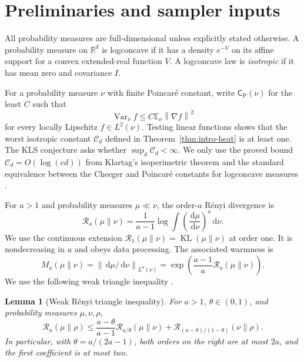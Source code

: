 \documentclass[11pt]{article}
\newtheorem{lemma}[theorem]{Lemma}
\theoremstyle{remark}
\newcommand{\R}{\mathbb R}
\newcommand{\E}{\mathbb E}
\newcommand{\1}{\bm 1}
\newcommand{\cP}{\mathsf C_{\mathrm P}}
\newcommand{\Var}{\operatorname{Var}}
\newcommand{\dd}{\,\mathrm d}
\newcommand{\norm}[1]{\left\lVert #1\right\rVert}
\begin{document}
\section{Preliminaries and sampler inputs}
\label{sec:preliminaries}

All probability measures are full-dimensional unless explicitly
stated otherwise.  A probability measure on $\R^d$ is logconcave if it
has a density $e^{-V}$ on its affine support for a convex extended-real
function $V$.  A logconcave law is \emph{isotropic} if it has mean zero
and covariance $I$.

For a probability measure $\nu$ with finite Poincar\'e constant, write
$\cP(\nu)$ for the least $C$ such that
\begin{equation}\label{eq:poincare}
  \Var_\nu f\leq C\E_\nu\norm{\nabla f}^2
\end{equation}
for every locally Lipschitz $f\in L^2(\nu)$.  Testing linear functions
shows that the worst isotropic constant $\mathcal C_d$ defined in
Theorem~\ref{thm:intro-heat} is at least one.  The KLS conjecture asks
whether $\sup_d\mathcal C_d<\infty$.  We only use the proved bound
$\mathcal C_d=O(\log(ed))$ from Klartag's isoperimetric theorem and the
standard equivalence between the Cheeger and Poincar\'e constants for
logconcave measures \citep{Chee70lower,Buser82iso,Led04spectral,Klartag23log}.

For $a>1$ and probability measures $\mu\ll\nu$, the order-$a$ R\'enyi
divergence is
\begin{equation}\label{eq:renyi}
  \mathcal R_a(\mu\|\nu)
  =\frac{1}{a-1}\log\int
    \left(\frac{\dd\mu}{\dd\nu}\right)^a\dd\nu.
\end{equation}
We use the continuous extension $\mathcal R_1(\mu\|\nu)
=\operatorname{KL}(\mu\|\nu)$ at order one.
It is nondecreasing in $a$ and obeys data processing.  The associated
warmness is
\[
  M_a(\mu\|\nu)
  =\norm{\dd\mu/\dd\nu}_{L^a(\nu)}
  =\exp\!\left(\frac{a-1}{a}\mathcal R_a(\mu\|\nu)\right).
\]
We use the following weak triangle inequality
\citep{vH14renyi,KV26zeroth}.

\begin{lemma}[Weak R\'enyi triangle inequality]
\label{lem:weak-triangle}
For $a>1$, $\theta\in(0,1)$, and probability measures
$\mu,\nu,\rho$,
\begin{equation}\label{eq:weak-triangle}
  \mathcal R_a(\mu\|\rho)
  \leq
  \frac{a-\theta}{a-1}
    \mathcal R_{a/\theta}(\mu\|\nu)
  +\mathcal R_{(a-\theta)/(1-\theta)}(\nu\|\rho).
\end{equation}
In particular, with $\theta=a/(2a-1)$, both orders on the right are at
most $2a$, and the first coefficient is at most two.
\end{lemma}
\end{document}
